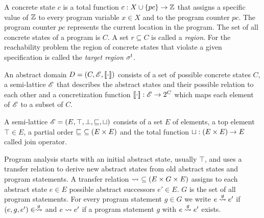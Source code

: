 A concrete state $c$ is a total function $c: X \cup \{pc\} \rightarrow \mathbb{Z}$ that assigns a specific value of $\mathbb{Z}$ to every program variable $x \in X$ and to the program counter $pc$. The program counter $pc$ represents the current location in the program.
The set of all concrete states of a program is $C$. A set $r \subseteq C$ is called a \emph{region}.
For the reachability problem the region of concrete states that violate a given specification is called the \emph{target region} $\sigma^{t}$.

An abstract domain \cite{Beyer2007} $D = (C, \mathscr{E}, [\![ \cdot ]\!])$ consists of a set of possible concrete states $C$, a semi-lattice $\mathscr{E}$ that describes the abstract states and their possible relation to each other and a concretization function $[\![ \cdot ]\!] : \mathscr{E} \rightarrow 2^C$ which maps each element of $\mathscr{E}$ to a subset of $C$.

A semi-lattice $\mathscr{E} = (E, \top, \bot, \sqsubseteq, \sqcup)$ consists of a set $E$ of elements, a top element $\top \in E$, a partial order $\sqsubseteq\ \subseteq (E \times E)$
and the total function $\sqcup : (E \times E) \rightarrow E$ called join operator.

Program analysis starts with an initial abstract state, usually $\top$, and uses a transfer relation to derive new abstract states from old abstract states and program statements.
A transfer relation \cite{Beyer2007} $\rightsquigarrow\ \subseteq (E \times G \times E)$ assigns to each abstract state $e \in E$ possible abstract successors $e' \in E$. $G$ is the set of all program statements.
For every program statement $g \in G$ we write $e \overset{g}{\rightsquigarrow} e'$ if $(e, g, e') \in \overset{g}{\rightsquigarrow}$ and $e \rightsquigarrow e'$ if a program statement $g$ with $e \overset{g}{\rightsquigarrow} e'$ exists.


